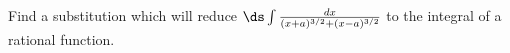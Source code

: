 Find a substitution which will reduce $\ds\int \frac{dx}{(x + a)^{3/2} + (x - a)^{3/2}}$ to the
integral of a rational function. 
